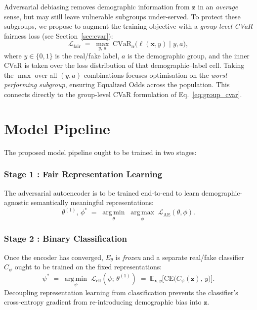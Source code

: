 Adversarial debiasing removes demographic information from $\mathbf{z}$ in an \emph{average} sense, but may still leave vulnerable subgroups under-served.  To protect these subgroups, we propose to augment the training objective with a \emph{group-level CVaR} fairness loss (see Section~\ref{sec:cvar}):
\begin{equation}
  \mathcal{L}_{\mathrm{fair}}
  \;=\;
  \max_{y,\,a}\;
  \mathrm{CVaR}_\alpha\!\bigl(\ell(\mathbf{x}, y) \mid y, a\bigr),
  \label{eq:fair_loss}
\end{equation}
where $y \in \{0,1\}$ is the real/fake label, $a$ is the demographic group, and the inner CVaR is taken over the loss distribution of that demographic--label cell.  Taking the $\max$ over all $(y, a)$ combinations focuses optimisation on the \emph{worst-performing subgroup}, ensuring Equalized Odds across the population.  This connects directly to the group-level CVaR formulation of Eq.~\ref{eq:group_cvar}.
 
\section{Model Pipeline}
\label{sec:training_strategy}
 
The proposed model pipeline ought to be trained in two stages:
 
\subsubsection{Stage 1 : Fair Representation Learning}
\label{subsec:stage1}
The adversarial autoencoder is to be trained end-to-end to learn demographic-agnostic semantically meaningful representations:
\begin{equation}
  \theta^{(1)},\,\phi^*
  \;=\;
  \operatorname*{arg\,min}_{\theta}\;
  \operatorname*{arg\,max}_{\phi}\;
  \mathcal{L}_{\mathrm{AE}}(\theta, \phi).
  \label{eq:stage1}
\end{equation}

\subsubsection{Stage 2 : Binary Classification}
\label{subsec:stage2}
 
Once the encoder has converged, $E_\theta$ is \emph{frozen} and a separate real/fake classifier $C_\psi$ ought to be trained on the fixed representations:
\begin{equation}
  \psi^*
  \;=\;
  \operatorname*{arg\,min}_{\psi}\;
  \mathcal{L}_{\mathrm{clf}}(\psi;\,\theta^{(1)})
  \;=\;
  \mathbb{E}_{\mathbf{x},y}\!\bigl[
    \mathrm{CE}\!\bigl(C_\psi(\mathbf{z}),\,y\bigr)
  \bigr].
  \label{eq:stage2}
\end{equation}
Decoupling representation learning from classification prevents the
classifier's cross-entropy gradient from re-introducing demographic
bias into $\mathbf{z}$.
 
